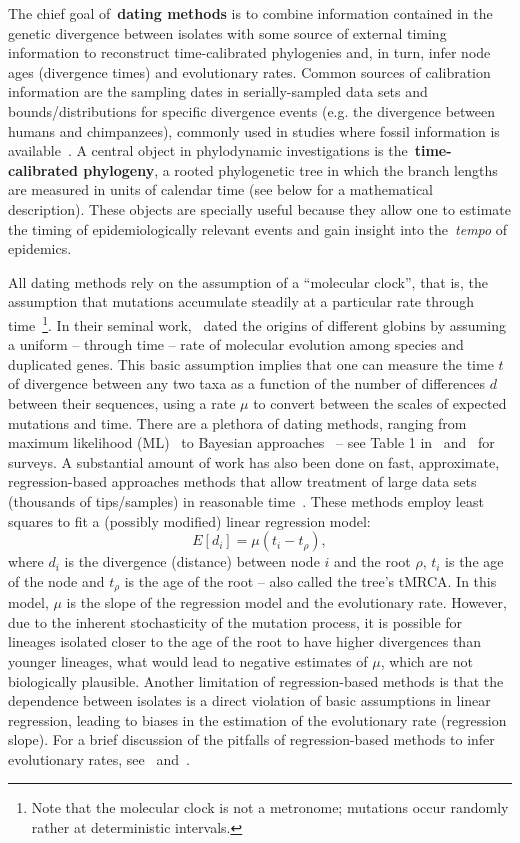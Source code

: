 The chief goal of~\textbf{dating methods} is to combine information contained in the genetic divergence between isolates with some source of external timing information to reconstruct time-calibrated phylogenies and, in turn, infer node ages (divergence times) and evolutionary rates.
Common sources of calibration information are the sampling dates in serially-sampled data sets and bounds/distributions for specific divergence events (e.g. the divergence between humans and chimpanzees), commonly used in studies where fossil information is available~\citep{Ho2009}.
A central object in phylodynamic investigations is the~\textbf{time-calibrated phylogeny}, a rooted phylogenetic tree in which the branch lengths are measured in units of calendar time (see below for a mathematical description).%
These objects are specially useful because they allow one to estimate the timing of epidemiologically relevant events and gain insight into the~\textit{tempo} of epidemics.

All dating methods rely on the assumption of a ``molecular clock'', that is, the assumption that mutations accumulate steadily at a particular rate through time~\citep{Welch2005}\footnote{Note that the molecular clock is not a metronome; mutations occur randomly rather at deterministic intervals.}.
In their seminal work,~\cite{Zuckerkandl1962} dated the origins of different globins by assuming a uniform -- through time -- rate of molecular evolution among species and duplicated genes.
This basic assumption implies that one can measure the time $t$ of divergence between any two taxa as a function of the number of differences $d$ between their sequences, using a rate $\mu$ to convert between the scales of expected mutations and time.
There are a plethora of dating methods, ranging from maximum likelihood (ML)~\citep{Rambaut2000,Volz2017,Sagulenko2018} to Bayesian approaches~\citep{Drummond2006} -- see Table 1 in~\cite{Welch2005} and~\cite{Ho2014} for surveys.
A substantial amount of work has also been done on fast, approximate, regression-based approaches methods that allow treatment of large data sets (thousands of tips/samples) in reasonable time~\citep{To2015,Rambaut2016}.
These methods employ least squares to fit  a (possibly modified) linear regression model: 
\[ E[d_{i}] = \mu \left(t_i-t_\rho\right) ,\]
where $d_i$ is the divergence (distance) between node $i$ and the root $\rho$, $t_i$ is the age of the node and $t_\rho$ is the age of the root -- also called the tree's tMRCA.
In this model, $\mu$ is the slope of the regression model and the evolutionary rate. 
However, due to the inherent stochasticity  of the mutation process, it is possible for lineages isolated closer to the age of the root to have higher divergences than younger lineages, what would lead to negative estimates of $\mu$, which are not biologically plausible. 
Another limitation of regression-based methods is that the dependence between isolates is a direct violation of basic assumptions in linear regression, leading to biases in the estimation of the evolutionary rate (regression slope).
For a brief discussion of the pitfalls of regression-based methods to infer evolutionary rates, see~\cite{To2015} and~\cite{Rambaut2016}.

